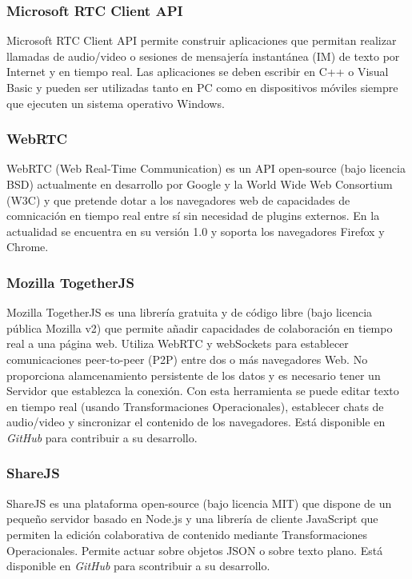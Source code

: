 	\subsubsection{Microsoft RTC Client API}
	
	Microsoft RTC Client API	 \cite{ref:microsoft_api} permite construir aplicaciones que permitan realizar llamadas de audio/video o sesiones de mensajería instantánea (IM) de texto por Internet y en tiempo real. Las aplicaciones se deben escribir en C++ o Visual Basic y pueden ser utilizadas tanto en PC como en dispositivos móviles siempre que ejecuten un sistema operativo Windows.
	
	\subsubsection{WebRTC}
	
	WebRTC \cite{ref:webRTC} (Web Real-Time Communication) es un API open-source (bajo licencia BSD) actualmente en desarrollo por Google y la World Wide Web Consortium (W3C) y que pretende dotar a los navegadores web de capacidades de comnicación en tiempo real entre sí sin necesidad de plugins externos. En la actualidad se encuentra en su versión 1.0 y soporta los navegadores Firefox y Chrome. 
	
	
	\subsubsection{Mozilla TogetherJS}

	Mozilla TogetherJS \cite{ref:togetherjs_api} es una librería gratuita y de código libre (bajo licencia pública Mozilla v2) que permite añadir capacidades de colaboración en tiempo real a una página web. Utiliza WebRTC y webSockets para establecer comunicaciones peer-to-peer (P2P) entre dos o más navegadores Web. No proporciona alamcenamiento persistente de los datos y es necesario tener un Servidor que establezca la conexión. Con esta herramienta se puede editar texto en tiempo real (usando Transformaciones Operacionales), establecer chats de audio/video y sincronizar el contenido de los navegadores. Está disponible en \textit{GitHub} \cite{ref:github} para contribuir a su desarrollo. 	
	
	\subsubsection{ShareJS}

	ShareJS \cite{ref:shareJS} es una plataforma open-source (bajo licencia MIT) que dispone de un pequeño servidor basado en Node.js y una librería de cliente JavaScript que permiten la edición colaborativa de contenido mediante Transformaciones Operacionales. Permite actuar sobre objetos JSON o sobre texto plano. Está disponible en \textit{GitHub} para scontribuir a su desarrollo.
	
